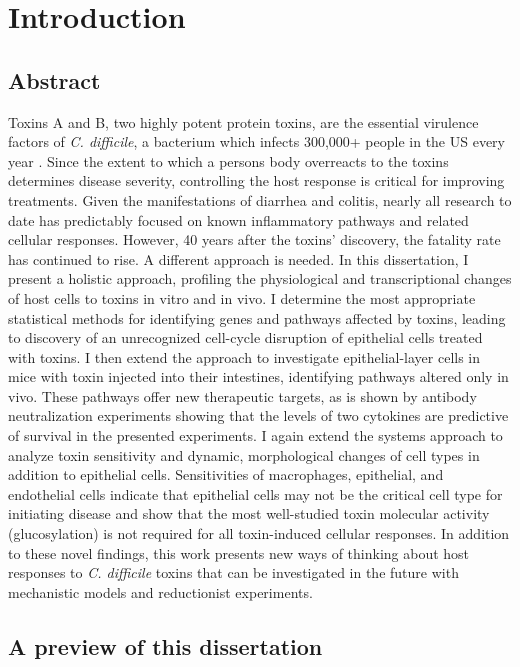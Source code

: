 
\chapter{Introduction}\label{chapter:intro1}

\section{Abstract}
Toxins A and B, two highly potent protein toxins, are the essential
virulence factors of \textit{C. difficile}, a bacterium which infects 300,000+
people in the US every year \cite{Lucado:2012wl}. 
Since the extent to which a persons body overreacts to the toxins
determines disease severity, controlling the host response is critical for improving treatments.
Given the manifestations of
diarrhea and colitis, nearly all research to date has predictably
focused on known inflammatory pathways and related cellular responses.
However, 40 years after the toxins' discovery, the fatality rate has continued to rise.
A different approach is needed. In this dissertation, I present a holistic approach,
profiling the physiological and transcriptional changes of host cells
to toxins in vitro and in vivo. I determine the most
appropriate statistical methods for identifying genes and pathways
affected by toxins, leading to discovery of an unrecognized cell-cycle
disruption of epithelial cells treated with toxins.
I then extend the approach to investigate epithelial-layer cells
in mice with toxin injected into their intestines, identifying
pathways altered only in vivo. These pathways offer new therapeutic targets,
as is shown by antibody neutralization experiments showing that the levels
of two cytokines are predictive of survival in the presented experiments.
I again extend the systems approach to analyze toxin sensitivity
and dynamic, morphological changes of cell types in addition to epithelial cells.
Sensitivities of macrophages, epithelial, and endothelial cells
indicate that epithelial cells may not be the critical cell type
for initiating disease and show that the most well-studied toxin molecular
activity (glucosylation) is not required for all toxin-induced cellular responses.
In addition to these novel findings, this work presents new ways of thinking
about host responses to \textit{C. difficile} toxins that can be investigated
in the future with mechanistic models and reductionist experiments.


\section{A preview of this dissertation}

